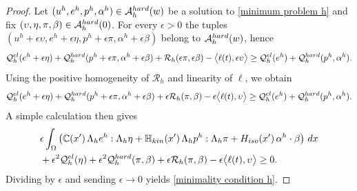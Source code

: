 \documentclass[10pt,a4paper]{amsart}
\newcommand{\C}{\mathbb{C}}
\newcommand{\Hiso}{H_{\rm iso}}
\newcommand{\Hkin}{\mathbb{H}_{\rm kin}}
\newcommand{\calA}{\mathcal{A}}
\newcommand{\calQ}{\mathcal{Q}}
\newcommand{\calR}{\mathcal{R}}
\begin{document}
\begin{proof}
Let $(u^h, e^h, p^h, \alpha^h) \in \calA_{h}^{\rm hard}(w)$ be a solution to \eqref{minimum problem h} and fix $(\upsilon, \eta, \pi, \beta) \in \calA_{h}^{\rm hard}(0)$. 
For every $\epsilon > 0$ the tuples $(u^h+\epsilon\upsilon, e^h+\epsilon\eta, p^h+\epsilon\pi, \alpha^h+\epsilon\beta)$ belong to $\calA_{h}^{\rm hard}(w)$, hence
\begin{equation*}
	\calQ^{\rm el}_{h}(e^h+\epsilon\eta) + \calQ^{\rm hard}_{h}(p^h+\epsilon\pi, \alpha^h+\epsilon\beta) + \calR_{h}(\epsilon\pi, \epsilon\beta) - \big\langle \ell(t), \epsilon\upsilon \big\rangle
	\geq \calQ^{\rm el}_{h}(e^h) + \calQ^{\rm hard}_{h}(p^h, \alpha^h).
\end{equation*}
Using the positive homogeneity of $\calR_{h}$ and linearity of $\ell$, we obtain
\begin{equation*}
	\calQ^{\rm el}_{h}(e^h+\epsilon\eta) + \calQ^{\rm hard}_{h}(p^h+\epsilon\pi, \alpha^h+\epsilon\beta) + \epsilon\calR_{h}(\pi, \beta) - \epsilon\big\langle \ell(t), \upsilon \big\rangle
	\geq \calQ^{\rm el}_{h}(e^h) + \calQ^{\rm hard}_{h}(p^h, \alpha^h).
\end{equation*}
A simple calculation then gives
\begin{align*}
	& \epsilon\int_{\Omega} \left( \C\!\left(x'\right) \Lambda_h e^h : \Lambda_h \eta + \Hkin\!\left(x'\right) \Lambda_h p^h : \Lambda_h \pi + \Hiso\!\left(x'\right) \alpha^h \cdot \beta \right) \,dx
	\\& + \epsilon^2\calQ^{\rm el}_{h}(\eta) + \epsilon^2\calQ^{\rm hard}_{h}(\pi, \beta) + \epsilon\calR_{h}(\pi, \beta) - \epsilon\big\langle \ell(t), \upsilon \big\rangle 
	\geq 0.
\end{align*}
Dividing by $\epsilon$ and sending $\epsilon \to 0$ yields \eqref{minimality condition h}. 


\end{proof}
\end{document}
